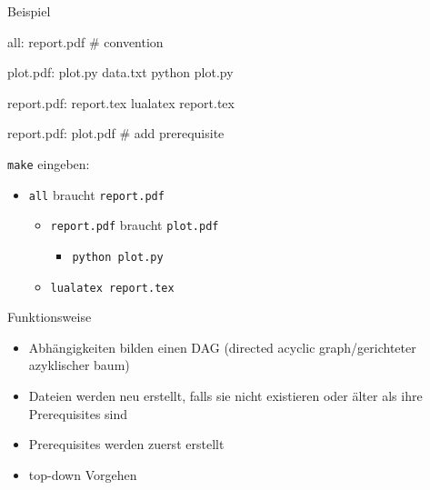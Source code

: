 \begin{frame}[fragile]{Beispiel}
  \begin{center}
    \begin{lstmake}
      all: report.pdf  # convention

      plot.pdf: plot.py data.txt
          python plot.py

      report.pdf: report.tex
          lualatex report.tex

      report.pdf: plot.pdf  # add prerequisite
    \end{lstmake}
  \end{center}
  \vspace{1em}

  \texttt{make} eingeben:
  \begin{itemize}
    \item \texttt{all} braucht \texttt{report.pdf}
      \begin{itemize}
        \item \texttt{report.pdf} braucht \texttt{plot.pdf}
          \begin{itemize}
            \item \texttt{python plot.py}
          \end{itemize}
        \item \texttt{lualatex report.tex}
    \end{itemize}
  \end{itemize}
\end{frame}

\begin{frame}{Funktionsweise}
  \begin{center}
  \end{center}

  \begin{itemize}
    \item Abhängigkeiten bilden einen DAG (directed acyclic graph/gerichteter azyklischer baum)
    \item Dateien werden neu erstellt, falls sie nicht existieren oder älter als ihre Prerequisites sind
    \item Prerequisites werden zuerst erstellt
    \item top-down Vorgehen
  \end{itemize}
\end{frame}

